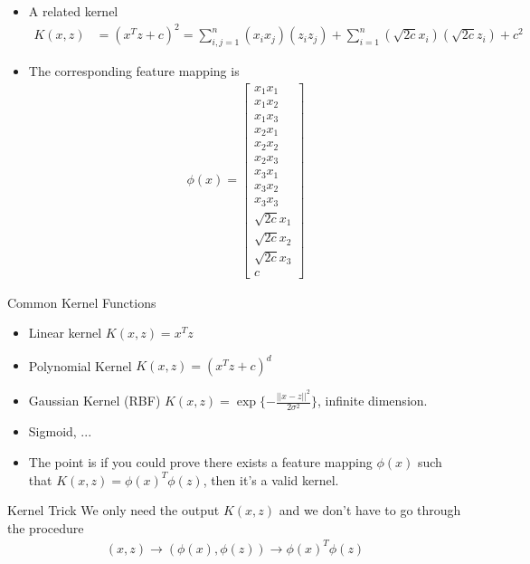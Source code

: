 \documentclass{beamer}
\begin{document}
\begin{frame}
\begin{itemize}
	\item A related kernel
	\begin{align*}
	K(x, z) &= (x^Tz+c)^2=\sum_{i,j=1}^n(x_ix_j)(z_iz_j) + \sum_{i=1}^n(\sqrt{2c}x_i)(\sqrt{2c}z_i) + c^2
	\end{align*}
	\item The corresponding feature mapping is
	\begin{align*}
	\phi(x) = \begin{bmatrix}
	x_1x_1\\
	x_1x_2\\
	x_1x_3\\
	x_2x_1\\
	x_2x_2\\
	x_2x_3\\
	x_3x_1\\
	x_3x_2\\
	x_3x_3\\
	\sqrt{2c}x_1\\
	\sqrt{2c}x_2\\
	\sqrt{2c}x_3\\
	c
	\end{bmatrix}
	\end{align*}
\end{itemize}
\end{frame}

\begin{frame}{Common Kernel Functions}
\begin{itemize}
	\item Linear kernel $K(x, z) = x^Tz$
	\item Polynomial Kernel $K(x, z) = (x^Tz + c)^d$
	\item Gaussian Kernel (RBF) $K(x, z) = \exp\{-\frac{||x - z||^2}{2\sigma^2}\}$, infinite dimension.
	\item Sigmoid, ...
	\item The point is if you could prove there exists a feature mapping $\phi(x)$ such that $K(x, z) = \phi(x)^T\phi(z)$, then it's a valid kernel.
\end{itemize}
\end{frame}

\begin{frame}{Kernel Trick}
We only need the output $K(x, z)$ and we don't have to go through the procedure 
\begin{align*}
(x, z)\to(\phi(x), \phi(z))\to\phi(x)^T\phi(z)
\end{align*}
\end{frame}
\end{document}
